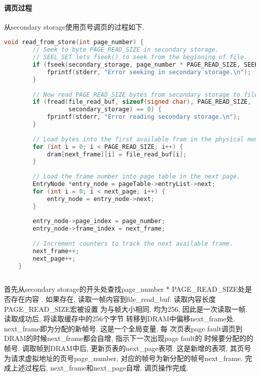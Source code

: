 \paragraph{调页过程}
从secondary storage使用页号调页的过程如下.
\begin{lstlisting}[language=c++]
    void read_from_store(int page_number) {
        // Seek to byte PAGE_READ_SIZE in secondary storage.
        // SEEL_SET lets fseek() to seek from the beginning of file.
        if (fseek(secondary_storage, page_number * PAGE_READ_SIZE, SEEK_SET) != 0) {
            fprintf(stderr, "Error seeking in secondary storage.\n");
        }
    
        // Now read PAGE_READ_SIZE bytes from secondary storage to file_read_buf.
        if (fread(file_read_buf, sizeof(signed char), PAGE_READ_SIZE,
                  secondary_storage) == 0) {
            fprintf(stderr, "Error reading secondary storage.\n");
        }
    
        // Load bytes into the first available fram in the physical memory 2D array.
        for (int i = 0; i < PAGE_READ_SIZE; i++) {
            dram[next_frame][i] = file_read_buf[i];
        }
    
        // Load the frame number into page table in the next page.
        EntryNode *entry_node = pageTable->entryList->next;
        for (int i = 0; i < next_page; i++) {
            entry_node = entry_node->next;
        }
    
        entry_node->page_index = page_number;
        entry_node->frame_index = next_frame;
    
        // Increment counters to track the next available frame.
        next_frame++;
        next_page++;
    }
    
\end{lstlisting}

首先从secondary storage的开头处查找page\_number * PAGE\_READ\_SIZE处是否存在内容
. 如果存在, 读取一帧内容到file\_read\_buf. 读取内容长度PAGE\_READ\_SIZE宏被设置
为与帧大小相同, 均为256, 因此是一次读取一帧. 读取成功后, 将读取缓存中的256个字节
转移到DRAM中偏移next\_frame处. next\_frame即为分配的新帧号. 这是一个全局变量, 每
次页表page fault调页到DRAM的时候next\_frame都会自增, 指示下一次出现page fault的
时候要分配的的帧号. 调取帧到DRAM中后, 更新页表的next\_page表项. 这是新增的表项,
其页号为请求虚拟地址的页号page\_number, 对应的帧号为新分配的帧号next\_frame. 完
成上述过程后, next\_frame和next\_page自增. 调页操作完成.

